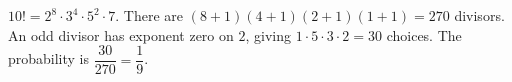$10!=2^8\cdot3^4\cdot5^2\cdot7$. There are $(8+1)(4+1)(2+1)(1+1)=270$ divisors. An odd divisor has exponent zero on $2$, giving $1\cdot5\cdot3\cdot2=30$ choices. The probability is $\dfrac{30}{270}=\boxed{\dfrac{1}{9}}$.
